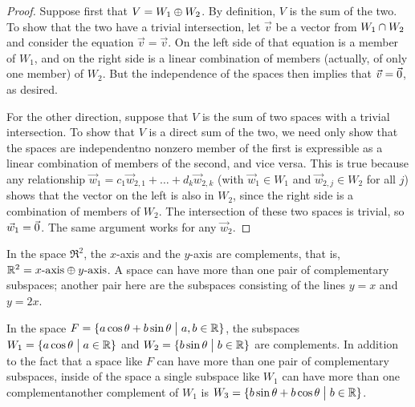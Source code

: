 \begin{proof}
Suppose first that $V=W_1\oplus W_2$.
By definition, $V$ is the sum of the two.
To show that the two have a trivial intersection,
let $\vec{v}$ be a vector from $W_1\cap W_2$
and consider the equation $\vec{v}=\vec{v}$.
On the left side of that equation is a member of $W_1$,
and on the right side is a linear combination of members (actually, of only
one member) of $W_2$.
But the independence of the spaces then implies that $\vec{v}=\vec{0}$, as
desired.

For the other direction, suppose that $V$ is the sum of two spaces
with a trivial intersection.
To show that $V$ is a direct sum of the two, we need only show that
the spaces are independent\Dash no nonzero member of the first is expressible 
as a linear combination of members of the second, and vice versa.
This is true because any relationship 
$\vec{w}_1=c_1\vec{w}_{2,1}+\dots+d_k\vec{w}_{2,k}$ (with $\vec{w}_1\in W_1$
and $\vec{w}_{2,j}\in W_2$ for all $j$) shows that the vector on the left is 
also in $W_2$, since the right side is a combination of members of $W_2$.
The intersection of these two spaces is trivial, so $\vec{w}_1=\vec{0}$.
The same argument works for any $\vec{w}_2$.
\end{proof}



\begin{example}
In the space $\Re^2$, the \( x \)-axis and the \( y \)-axis are complements,
that is, $\mathbb{R}^2=\text{$x$-axis}\oplus\text{$y$-axis}$.
A space can have more than one pair of complementary subspaces;
another pair here are the subspaces consisting of the 
lines \( y=x \) and \( y=2x \).
\end{example}

\begin{example}
In the space \( F=\mbox{$\{a\cos\theta+b\sin\theta\bigm| a,b\in\mathbb{R}\}$} \),
the subspaces \( W_1=\mbox{$\{a\cos\theta\bigm| a\in\mathbb{R}\}$} \) and
\( W_2=\mbox{$\{b\sin\theta\bigm| b\in\mathbb{R}\}$} \) are complements.
In addition to the fact that a space like $F$ can have more than one pair of
complementary subspaces, inside of the space a single subspace like $W_1$ can
have more than one complement\Dash another 
complement of \( W_1 \) is
\( W_3=\mbox{$\{b\sin\theta+b\cos\theta \bigm| b\in\mathbb{R}\}$} \).
\end{example}

